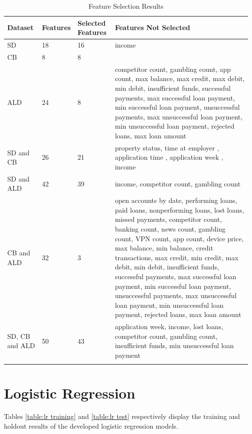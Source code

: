 \begin{longtable}{|p{3cm}|p{2cm}|p{2cm}|p{6cm}|} 
\hline
\multicolumn{1}{|p{3cm}|}{Dataset}
&\multicolumn{1}{|p{2cm}|}{Features}
&\multicolumn{1}{|p{2cm}|}{Selected Features}
&\multicolumn{1}{|p{6cm}|}{Features Not Selected}\\
\hline
SD & 18 & 16 & income   \\
\hline
CB & 8 & 8 &   \\
\hline
ALD & 24 & 8  & competitor count, gambling count, app count, max balance, max credit, max debit, min debit, insufficient funds,  successful payments, max successful loan payment, min  successful loan payment, unsuccessful payments, max unsuccessful loan payment, min unsuccessful loan payment, rejected loans, max loan amount \\
\hline
SD and CB & 26 & 21 & property status, time at employer , application time , application week , income \\
\hline
SD and ALD & 42 & 39 & income, competitor count, gambling count \\
\hline
CB and ALD & 32 & 3 &  open accounts by date, performing loans, paid loans, nonperforming loans, lost loans, missed payments, competitor count, banking count, news count, gambling count, VPN count, app count, device price, max balance, min balance, credit transactions, max credit, min credit, max debit, min debit, insufficient funds, successful payments, max successful loan payment, min successful loan payment, unsuccessful payments, max unsuccessful loan payment, min unsuccessful loan payment, rejected loans, max loan amount \\
\hline
SD, CB and ALD & 50 & 43 & application week, income, lost loans, competitor count, gambling count, insufficient funds, min unsuccessful loan payment\\
\hline
\caption{Feature Selection Results}
\label{table:features retained}
\end{longtable}

\vspace{10pt}

\newpage


\section{Logistic Regression}

Tables \ref{table:lr training} and \ref{table:lr test} respectively display the training and holdout results of the developed logistic regression models. \\

